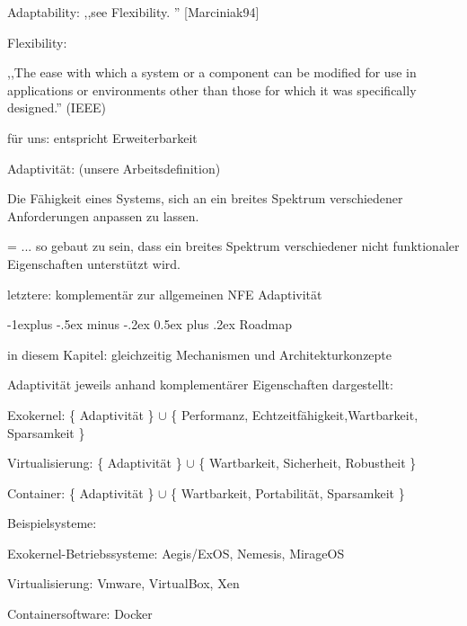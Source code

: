 \documentclass[a4paper]{article}
\makeatletter
\renewcommand{\subsection}{\@startsection{subsection}{2}{0mm}%
 {-1explus -.5ex minus -.2ex}%
 {0.5ex plus .2ex}%
 {\normalfont\normalsize\bfseries}}
\makeatother
\begin{document}
\begin{multicols}{3}
    \begin{itemize*}
        \item
        Adaptability: ,,see Flexibility. '' [Marciniak94]
        \item
        Flexibility:
        \begin{itemize*}
            \item ,,The ease with which a system or a component can be modified for use in applications or environments other than those for which it was specifically designed.'' (IEEE)
            \item für uns: entspricht Erweiterbarkeit
        \end{itemize*}
        \item
        Adaptivität: (unsere Arbeitsdefinition)
        \begin{itemize*}
            \item Die Fähigkeit eines Systems, sich an ein breites Spektrum verschiedener Anforderungen anpassen zu lassen.
            \item = ... so gebaut zu sein, dass ein breites Spektrum verschiedener nicht funktionaler Eigenschaften unterstützt wird.
            \item letztere: komplementär zur allgemeinen NFE Adaptivität
        \end{itemize*}
    \end{itemize*}


    \subsection{Roadmap}

    \begin{itemize*}
        \item
        in diesem Kapitel: gleichzeitig Mechanismen und Architekturkonzepte
        \item
        Adaptivität jeweils anhand komplementärer Eigenschaften dargestellt:
        \begin{itemize*}
            \item Exokernel: \{ Adaptivität \} $\cup$ \{ Performanz, Echtzeitfähigkeit,Wartbarkeit, Sparsamkeit \}
            \item Virtualisierung: \{ Adaptivität \} $\cup$ \{ Wartbarkeit, Sicherheit, Robustheit \}
            \item Container: \{ Adaptivität \} $\cup$ \{ Wartbarkeit, Portabilität, Sparsamkeit \}
        \end{itemize*}
        \item
        Beispielsysteme:
        \begin{itemize*}
            \item Exokernel-Betriebssysteme: Aegis/ExOS, Nemesis, MirageOS
            \item Virtualisierung: Vmware, VirtualBox, Xen
            \item Containersoftware: Docker
        \end{itemize*}
    \end{itemize*}



\end{multicols}
\end{document}
